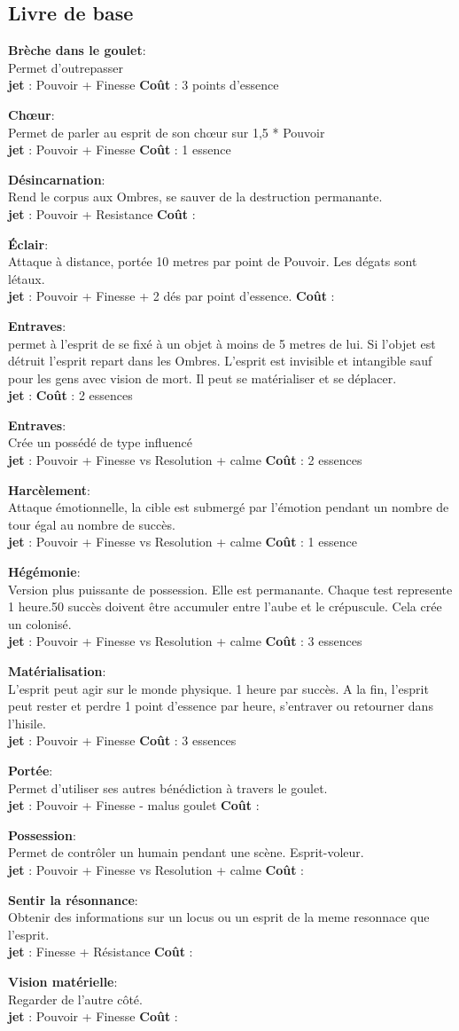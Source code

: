 \documentclass[oneside,12pt]{book}
\newcommand\bless[4]{
\textbf{#1}: \\
#2 \\
\textbf{jet} : #3
\textbf{Coût} : #4 \\
\vspace{0.5cm}
}
\begin{document}
\begin{flushleft}
\section{Livre de base}
\bless{Brèche dans le goulet}{Permet d'outrepasser}{Pouvoir + Finesse}{3 points d'essence}
\bless{Chœur}{Permet de parler au esprit de son chœur sur 1,5 * Pouvoir}{Pouvoir + Finesse}{1 essence}
\bless{Désincarnation}{Rend le corpus aux Ombres, se sauver de la destruction permanante.}{Pouvoir + Resistance}{}
\bless{Éclair}{Attaque à distance, portée 10 metres par point de Pouvoir. Les dégats sont létaux.}{Pouvoir + Finesse + 2 dés par point d'essence.}{}
\bless{Entraves}{permet à l'esprit de se fixé à un objet à moins de 5 metres de lui. Si l'objet est détruit l'esprit repart dans les Ombres. L'esprit est invisible et intangible sauf pour les gens avec vision de mort. Il peut se matérialiser et se déplacer.}{}{2 essences}
\bless{Entraves}{Crée un possédé de type influencé}{Pouvoir + Finesse vs Resolution + calme}{2 essences}
\bless{Harcèlement}{Attaque émotionnelle, la cible est submergé par l'émotion pendant un nombre de tour égal au nombre de succès.}{Pouvoir + Finesse vs Resolution + calme}{1 essence}
\bless{Hégémonie}{Version plus puissante de possession. Elle est permanante. Chaque test represente 1 heure.50 succès doivent être accumuler entre l'aube et le crépuscule. Cela crée un colonisé. }{Pouvoir + Finesse vs Resolution + calme}{3 essences}
\bless{Matérialisation}{L'esprit peut agir sur le monde physique. 1 heure par succès. A la fin, l'esprit peut rester et perdre 1 point d'essence par heure, s'entraver ou retourner dans l'hisile.}{Pouvoir + Finesse}{3 essences}
\bless{Portée}{Permet d'utiliser ses autres bénédiction à travers le goulet.}{Pouvoir + Finesse - malus goulet}{}
\bless{Possession}{Permet de contrôler un humain pendant une scène. Esprit-voleur.}{Pouvoir + Finesse vs Resolution + calme}{}
\bless{Sentir la résonnance}{Obtenir des informations sur un locus ou un esprit de la meme resonnace que l'esprit.}{Finesse + Résistance}{}
\bless{Vision matérielle}{Regarder de l'autre côté.}{Pouvoir + Finesse}{}


\end{flushleft}
\end{document}
